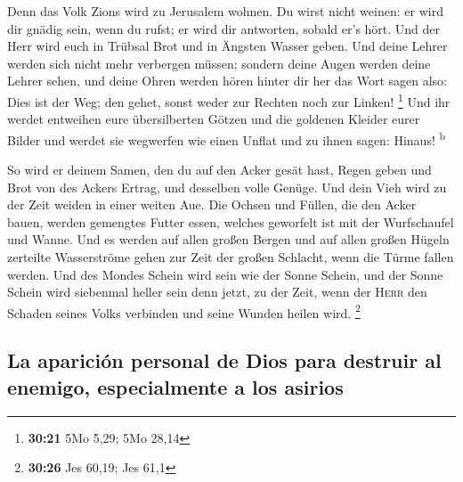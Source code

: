  Denn das Volk Zions wird zu Jerusalem wohnen. Du wirst
nicht weinen: er wird dir gnädig sein, wenn du rufst; er wird dir
antworten, sobald er's hört.  Und der Herr wird euch in
Trübsal Brot und in Ängsten Wasser geben. Und deine Lehrer werden sich
nicht mehr verbergen müssen; sondern deine Augen werden deine Lehrer
sehen,  und deine Ohren werden hören hinter dir her das
Wort sagen also: Dies ist der Weg; den gehet, sonst weder zur Rechten
noch zur Linken! \footnote{\textbf{30:21} 5Mo 5,29; 5Mo 28,14}
 Und ihr werdet entweihen eure übersilberten Götzen und
die goldenen Kleider eurer Bilder und werdet sie wegwerfen wie einen
Unflat und zu ihnen sagen: Hinaus! \textsuperscript{b}

 So wird er deinem Samen, den du auf den Acker gesät
hast, Regen geben und Brot von des Ackers Ertrag, und desselben volle
Genüge. Und dein Vieh wird zu der Zeit weiden in einer weiten Aue.
 Die Ochsen und Füllen, die den Acker bauen, werden
gemengtes Futter essen, welches geworfelt ist mit der Wurfschaufel und
Wanne.  Und es werden auf allen großen Bergen und auf
allen großen Hügeln zerteilte Wasserströme gehen zur Zeit der großen
Schlacht, wenn die Türme fallen werden.  Und des Mondes
Schein wird sein wie der Sonne Schein, und der Sonne Schein wird
siebenmal heller sein denn jetzt, zu der Zeit, wenn der \textsc{Herr}
den Schaden seines Volks verbinden und seine Wunden heilen wird.
\footnote{\textbf{30:26} Jes 60,19; Jes 61,1}

\hypertarget{la-apariciuxf3n-personal-de-dios-para-destruir-al-enemigo-especialmente-a-los-asirios}{%
\subsection{La aparición personal de Dios para destruir al enemigo,
especialmente a los
asirios}\label{la-apariciuxf3n-personal-de-dios-para-destruir-al-enemigo-especialmente-a-los-asirios}}

